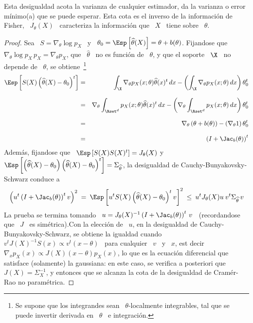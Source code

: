 %
\noindent Esta desigualdad  acota la varianza de cualquier  estimador, \ie da la
varianza o error m\'inimo(a) que se puede esperar. Esta cota es el inverso de la
informaci\'on de Fisher, \ie \  $J_\theta(X)$ \ caracteriza la informaci\'on que
\ $X$ \ tiene sobre \ $\theta$.
%
\begin{proof}
  Sea  \   $S  =  \nabla_\theta  \log   p_X$  \  y  \   $\theta_0  =  \Esp\left[
    \widehat{\theta}(X)  \right]   =  \theta  +  b(\theta)$.   Fijandose  que  \
  $\nabla_\theta \log p_X \, p_X  = \nabla_\theta p_X$, que \ $\widehat{\theta}$
  \ no  es funci\'on de \ $\theta$,  y que el soporte  \ $\X$ \ no  depende de \
  $\theta$,  se   obtiene~\footnote{Se  supone   que  los  integrandes   sean  \
    $\theta$-localmente  integrables, tal que  se puede  invertir derivada  en \
    $\theta$ \ e integraci\'on.}
  \begin{eqnarray*}
  \Esp\left[ S(X) \left( \widehat{\theta}(X) - \theta_0 \right)^t \right] & = &
  \int_\X \nabla_\theta p_X(x;\theta) \widehat{\theta}(x)^t \, dx - \left(
  \int_\X \nabla_\theta p_X(x;\theta) \, dx \right) \theta_0^t\\[2.5mm]
  & = & \nabla_\theta \int_{\Rset^d} p_X(x;\theta) \widehat{\theta}(x)^t \, dx -
  \left( \nabla_\theta \int_{\Rset^d} p_X(x;\theta) \, dx \right)
  \theta_0^t\\[2.5mm]
  & = & \nabla_\theta \left( \theta + b(\theta) \right)  - 
  \left( \nabla_\theta 1 \right) \theta_0^t\\[2.5mm]
  & = & \left( I + \Jac_b(\theta) \right)^t
  \end{eqnarray*}
  Adem\'as, fijandose  que \  $\Esp\left[ S(X) S(X)^t  \right] =  J_\theta(X)$ y
  $\Esp\left[   \left(    \widehat{\theta}(X)   -   \theta_0    \right)   \left(
      \widehat{\theta}(X)      -      \theta_0      \right)^t     \right]      =
  \Sigma_{\widehat{\theta}}$,            la            desigualdad            de
  Cauchy-Bunyakovsky-Schwarz
conduce a
  \[
  \left( u^t \left( I + \Jac_b(\theta)  \right)^t v \right)^2 \: = \: \Esp\left[
    u^t S(X) \left( \widehat{\theta}(X) -  \theta_0 \right)^t v \right]^2 \: \le
  \: u^t J_\theta(X) u \: v^t \Sigma_{\widehat{\theta}} \, v
  \]
  La prueba se termina tomando \ $u = J_\theta(X)^{-1} \left( I + \Jac_b(\theta)
  \right)^t \,  v$ \ (recordandose que  \ $J$ \ es  sim\'etrica).\newline Con la
  elecci\'on  de \  $u$,  en la  desigualdad  de Cauchy-Bunyakovsky-Schwarz,  se
  obtiene la igualdad  cuando \ $v^t J(X)^{-1} S(x) \propto v^t  (x - \theta)$ \
  para cualquier \ $v$ \ y \ $x$,  est decir \ $\nabla_x p_X (x) \propto J(X) (x
  -  \theta)  p_X(x)$,  lo  que  es  la  ecuaci\'on  diferencial  que  satisface
  (solamente) la gaussiana: en este caso, se verifica a posteriori que \ $J(X) =
  \Sigma_X^{-1}$,  y  entonces que  se  alcanza la  cota  de  la desigualdad  de
  Cram\'er-Rao no param\'etrica.
\end{proof}
